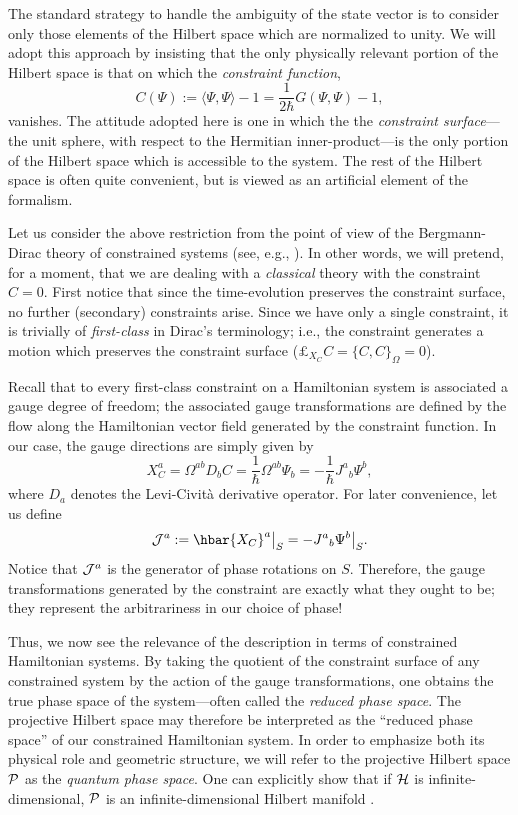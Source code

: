 \documentclass[12pt,aps,eqsecnum,tighten]{revtex4-2}
\def\be{\begin{equation}}
\def\ee{\end{equation}}
\def\<{\langle}
\def\>{\rangle}
\def\H{{\cal H}}
\def\P{{\cal P}}
\def\W{\Omega}
\def\J{{\cal J}}
\newcommand{\lie}[1]{{\pounds}_{#1}}
\newcommand{\hvf}[1]{{X_{#1}}}
\begin{document}
The standard strategy to handle the ambiguity of the state vector is
to consider only those elements of the Hilbert space which are
normalized to unity. We will adopt this approach by insisting that the
only physically relevant portion of the Hilbert space is that on which
the {\em constraint function},
%
\be \label{constraint}
C(\Psi) := \< \Psi, \Psi \> -1
= \frac{1}{2\hbar} G( \Psi, \Psi ) - 1,
\ee
%
vanishes.  The attitude adopted here is one in which the the {\em
constraint surface}---the unit sphere, with respect to the Hermitian
inner-product---is the only portion of the Hilbert space which is
accessible to the system.  The rest of the Hilbert space is often
quite convenient, but is viewed as an artificial element of the
formalism.

Let us consider the above restriction from the point of view of the
Bergmann-Dirac theory of constrained systems (see, e.g.,
\cite{bd}). In other words, we will pretend, for a moment, that we are
dealing with a {\em classical} theory with the constraint $C=0$.  First
notice that since the time-evolution preserves the constraint surface,
no further (secondary) constraints arise.  Since we have only
a single constraint, it is trivially of {\em first-class} in Dirac's
terminology; i.e., the constraint generates a motion which preserves
the constraint surface ($\lie{\hvf{C}} C = \{ C, C\}_\W = 0$).

Recall that to every first-class constraint on a Hamiltonian system is
associated a gauge degree of freedom; the associated gauge
transformations are defined by the flow along the Hamiltonian vector
field generated by the constraint function.  In our case, the gauge
directions are simply given by
% 
\be X^a_{C} = \W^{ab} D_b C =
\frac{1}{\hbar}\W^{ab} \Psi_b
		  = - \frac{1}{\hbar} J^a{}_b \Psi^b,
\ee
%
where $D_a$ denotes the Levi-Civit\`a derivative operator.  For later
convenience, let us define
%
\be
	\J^a := \hbar \hvf{C}^a\big|_S = - J^a{}_b \Psi^b\big|_S.
\ee
%
Notice that $\J^a$ is the generator of phase rotations on $S$.
Therefore, the gauge transformations generated by the constraint are
exactly what they ought to be; they represent the arbitrariness in our
choice of phase!

Thus, we now see the relevance of the description in terms of
constrained Hamiltonian systems.  By taking the quotient of the
constraint surface of any constrained system by the action of the
gauge transformations, one obtains the true phase space of the
system---often called the {\em reduced phase space}.  The projective
Hilbert space may therefore be interpreted as the ``reduced phase
space'' of our constrained Hamiltonian system.  In order to emphasize
both its physical role and geometric structure, we will refer to the
projective Hilbert space $\P$ as the {\em quantum phase space}. One
can explicitly show that if $\H$ is infinite-dimensional, $\P$ is an
infinite-dimensional Hilbert manifold \cite{thesis}.
\end{document}
